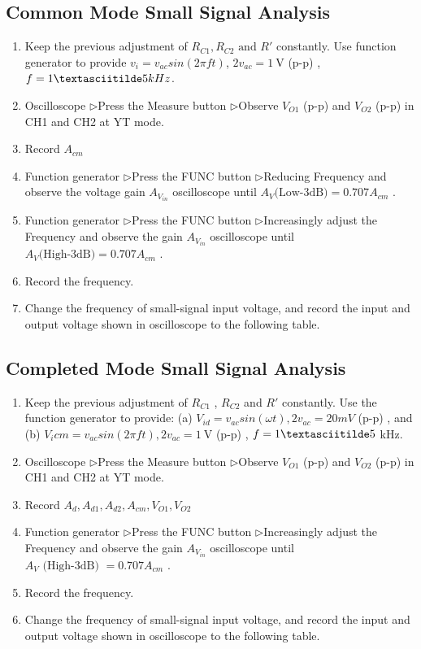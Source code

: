 \documentclass[12pt, a4paper]{article}
\newcommand{\tri}{$\rhd$}
\begin{document}
\subsection{Common Mode Small Signal Analysis}
\begin{enumerate}[itemsep=0pt]
  \item Keep the previous adjustment of $R_{C1}  , R_{C2} \text{ and } R'$ constantly. Use function
    generator to provide  $v_i  = v_{ac} sin(2 \pi ft)$, $2v_{ac} = \SI{1}\V$ (p-p) , $f = 1 \textasciitilde 5 kHz$.
  \item  Oscilloscope  \tri Press the Measure button  \tri  Observe $V_{O1}$ (p-p) and $V_{O2}$ (p-p)
in CH1 and CH2 at YT mode.
\item  Record $A_{cm}$
\item  Function generator  \tri  Press the FUNC button  \tri  Reducing Frequency and
  observe the voltage gain $A_{V_{in}}$ oscilloscope until $A_V \text{(Low-3dB)} = 0.707 A_{cm}$ .
\item  Function generator  \tri  Press the FUNC button  \tri  Increasingly adjust the
  Frequency and observe the gain $A_{V_{in}}$ oscilloscope until $A_V \text{(High-3dB)} = 0.707 A_{cm}$ .
\item  Record the frequency.
\item  Change the frequency of small-signal input voltage, and record the input
and output voltage shown in oscilloscope to the following table.

\end{enumerate}

\subsection{Completed Mode Small Signal Analysis}
\begin{enumerate}[itemsep=0pt]
  \item  Keep the previous adjustment of $R_{C1}$  , $R_{C2}$  and $R'$ constantly. Use the
function generator to provide:
(a)  $V_{id} = v_{ac} sin( \omega t), 2v_{ac} = 20 mV$ (p-p) , and
(b)  $V_i cm = v_{ac} sin(2 \pi ft), 2v_{ac} = \SI{1}\V$ (p-p) , $f = 1 \textasciitilde 5$ kHz.
\item  Oscilloscope  \tri Press the Measure button  \tri  Observe $V_{O1}$ (p-p) and $V_{O2}$ (p-p)
in CH1 and CH2 at YT mode.
\item  Record $A_d, A_{d1}, A_{d2}, A_{cm}, V_{O1}, V_{O2}$ 
\item  Function generator  \tri  Press the FUNC button  \tri  Increasingly adjust the
  Frequency and observe the gain $A_{V_{in}}$ oscilloscope until $A_V \text{ (High-3dB) } = 0.707  A_{cm}$ .
\item  Record the frequency.
\item  Change the frequency of small-signal input voltage, and record the input
and output voltage shown in oscilloscope to the following table.
\end{enumerate}
\end{document}
